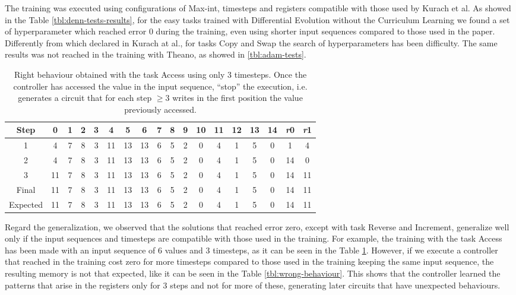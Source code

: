 The training was executed using configurations of Max-int, timesteps and registers compatible with those used by Kurach et al. As showed in the Table \ref{tbl:denn-tests-results}, for the easy tasks trained with Differential Evolution without the Curriculum Learning we found a set of hyperparameter which reached error 0 during the training, even using shorter input sequences compared to those used in the paper. Differently from which declared in Kurach at al., for tasks Copy and Swap the search of hyperparameters has been difficulty. The same results was not reached in the training with Theano, as showed in \ref{tbl:adam-tests}. 
\begin{table}[h]
	\centering
	\begin{tabular}{c|ccccccccccccccc|cc}
		\rowcolor{Gray}\textbf{Step} & 0 & 1 & 2 & 3 & 4 & 5 & 6 & 7 & 8 & 9 & 10 & 11 & 12 & 13 & 14 & \textit{r}0 & \textit{r}1 \\ \hline 
1 & 4 & 7 & 8 & 3 & 11 & 13 & 13 & 6 & 5 & 2 & 0 & 4 & 1 & 5 & 0 & 1 & 4 \\ 
2 & 4 & 7 & 8 & 3 & 11 & 13 & 13 & 6 & 5 & 2 & 0 & 4 & 1 & 5 & 0 & 14 & 0 \\ 
3 & 11 & 7 & 8 & 3 & 11 & 13 & 13 & 6 & 5 & 2 & 0 & 4 & 1 & 5 & 0 & 14 & 11 \\ \hline 
\rowcolor{Gray}Final & 11 & 7 & 8 & 3 & 11 & 13 & 13 & 6 & 5 & 2 & 0 & 4 & 1 & 5 & 0 & 14 & 11 \\
\rowcolor{Gray}Expected & 11 & 7 & 8 & 3 & 11 & 13 & 13 & 6 & 5 & 2 & 0 & 4 & 1 & 5 & 0 & 14 & 11 \\
	\end{tabular}
	\caption{Right behaviour obtained with the task Access using only 3 timesteps. Once the controller has accessed the value in the input sequence, ``stop'' the execution, i.e. generates a circuit that for each step $\geq 3$ writes in the first position the value previously accessed.}
	\label{tbl:right-behaviour}
\end{table}
Regard the generalization, we observed that the solutions that reached error zero, except with task Reverse and Increment, generalize well only if the input sequences and timesteps are compatible with those used in the training. For example, the training with the task Access has been made with an input sequence of 6 values and 3 timesteps, as it can be seen in the Table \ref{tbl:right-behaviour}. However, if we execute a controller that reached in the training cost zero for more timesteps compared to those used in the training keeping the same input sequence, the resulting memory is not that expected, like it can be seen in the Table \ref{tbl:wrong-behaviour}. This shows that the controller learned the patterns that arise in the registers only for 3 steps and not for more of these, generating later circuits that have unexpected behaviours.\newline
